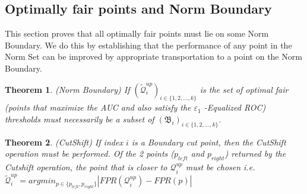 \documentclass{article}
\newtheorem{theorem}{Theorem}[section]
\newcommand{\ourdef}{-Equalized ROC}
\begin{document}
\subsection{Optimally fair points and Norm Boundary}
This section proves that all optimally fair points must lie on some Norm Boundary. We do this by establishing that the performance of any point in the Norm Set can be improved by appropriate transportation to a point on the Norm Boundary.

\begin{theorem}(Norm Boundary)
    If $(\widetilde{\mathcal{Q}}_i^{up})_{i\in \{1 ,2 , \hdots , k\}}$ is the set of optimal fair (points that maximize the AUC and also satisfy the $\varepsilon_1$ \ourdef) thresholds must necessarily be a subset of $(\mathfrak{B}_i)_{i\in \{1 ,2 , \hdots , k\}}$. 
\end{theorem}


\begin{theorem}(CutShift)
    If index $i$ is a Boundary cut point, then the CutShift operation must be performed. Of the 2 points ($p_{left}$ and $p_{right}$) returned by the Cutshift operation, the point that is closer to $\mathcal{Q}_{i}^{up}$ must be chosen i.e.$\mathcal{\widetilde{Q}}_i^{up} = argmin_{p \in \{ p_{left} , p_{right}\}} |FPR(\mathcal{Q}_i^{up}) - FPR(p)|$
\end{theorem}
\end{document}
